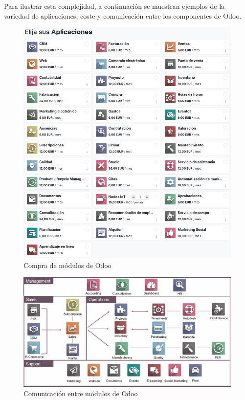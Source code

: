\par Para ilustrar esta complejidad, a continuación se muestran ejemplos de la variedad de aplicaciones, coste y comunicación entre los componentes de Odoo.
\begin{figure}[h]
\centering
\includegraphics[scale=0.4]{archivos/odooModules.png}
\caption{Compra de módulos de Odoo}
\label{fig:odooModules_compra}
\end{figure}
\clearpage
\begin{figure}[h]
\centering
\includegraphics[scale=0.38]{archivos/odooModules2.png}
\caption{Comunicación entre módulos de Odoo}
\label{fig:odooModules_comunicacion}
\end{figure}
